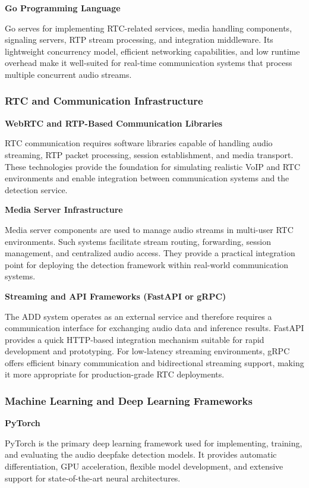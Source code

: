 \textbf{Go Programming Language}

Go serves for implementing RTC-related services, media handling components, signaling servers, RTP stream processing, and integration middleware. Its lightweight concurrency model, efficient networking capabilities, and low runtime overhead make it well-suited for real-time communication systems that process multiple concurrent audio streams.


\subsubsection{RTC and Communication Infrastructure}
\vspace{0.5cm}
\textbf{WebRTC and RTP-Based Communication Libraries}

RTC communication requires software libraries capable of handling audio streaming, RTP packet processing, session establishment, and media transport. These technologies provide the foundation for simulating realistic VoIP and RTC environments and enable integration between communication systems and the detection service.

\textbf{Media Server Infrastructure}

Media server components are used to manage audio streams in multi-user RTC environments. Such systems facilitate stream routing, forwarding, session management, and centralized audio access. They provide a practical integration point for deploying the detection framework within real-world communication systems.

\textbf{Streaming and API Frameworks (FastAPI or gRPC)}

The ADD system operates as an external service and therefore requires a communication interface for exchanging audio data and inference results. FastAPI provides a quick HTTP-based integration mechanism suitable for rapid development and prototyping. For low-latency streaming environments, gRPC offers efficient binary communication and bidirectional streaming support, making it more appropriate for production-grade RTC deployments.


\subsubsection{Machine Learning and Deep Learning Frameworks}
\vspace{0.5cm}
\textbf{PyTorch}

PyTorch is the primary deep learning framework used for implementing, training, and evaluating the audio deepfake detection models. It provides automatic differentiation, GPU acceleration, flexible model development, and extensive support for state-of-the-art neural architectures.

